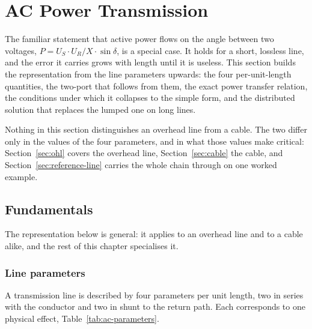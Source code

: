 \section{AC Power Transmission}
\label{sec:ac-chapter}

The familiar statement that active power flows on the angle between two
voltages, $P = U_S \cdot U_R / X \cdot \sin\delta$, is a special case. It
holds for a short, lossless line, and the error it carries grows with length
until it is useless. This section builds the representation from the line
parameters upwards: the four per-unit-length quantities, the two-port that
follows from them, the exact power transfer relation, the conditions under
which it collapses to the simple form, and the distributed solution that
replaces the lumped one on long lines.

Nothing in this section distinguishes an overhead line from a cable. The two
differ only in the values of the four parameters, and in what those values
make critical: Section~\ref{sec:ohl} covers the overhead line,
Section~\ref{sec:cable} the cable, and Section~\ref{sec:reference-line}
carries the whole chain through on one worked example.

\subsection{Fundamentals}
\label{sec:ac-transmission}

The representation below is general: it applies to an overhead line
and to a cable alike, and the rest of this chapter specialises it.

\subsubsection{Line parameters}
\label{sec:ac-parameters}

A transmission line is described by four parameters per unit length, two in
series with the conductor and two in shunt to the return path. Each
corresponds to one physical effect, Table~\ref{tab:ac-parameters}.

